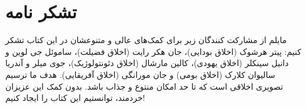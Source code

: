 
\section*{تشکر نامه}
\label{sec:تشکر نامه}
مایلم از مشارکت کنندگان زیر برای کمک‌های عالی و متنوعشان در این کتاب تشکر کنیم: پیتر هرشوک (اخلاق بودایی)، جان هکر رایت (اخلاق فضیلت)، ساموئل جی لوین و دانیل سینکلر (اخلاق یهودی)، کالین مارشال (اخلاق دئونتولوژیک)، جوی میلر و آندریا سالیوان کلارک (اخلاق بومی) و جان مورانگی (اخلاق آفریقایی).
هدف ما ترسیم تصویری اخلاقی است که تا حد امکان منتوع و جذاب باشد.
بدون کمک این عزیزان خردمند، توانستیم این کتاب را ایجاد کنیم!

\newpage


